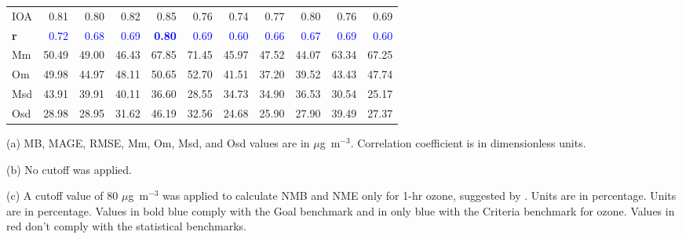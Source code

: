 \begin{table}
\begin{threeparttable}[b]
\begin{tabular}{lrrrrrrrrrr}
IOA  &      0.81 &      0.80 &     0.82 &    0.85 &     0.76 &      0.74 &      0.77 &     0.80 &    0.76 &     0.69 \\
\bf r   &      \textcolor{blue}{0.72} &      \textcolor{blue}{0.68} &     \textcolor{blue}{0.69} &    \textcolor{blue}{\bf 0.80} &     \textcolor{blue}{0.69} &      \textcolor{blue}{0.60} &      \textcolor{blue}{0.66} &     \textcolor{blue}{0.67} &    \textcolor{blue}{0.69} &     \textcolor{blue}{0.60} \\
Mm   &     50.49 &     49.00 &    46.43 &   67.85 &    71.45 &     45.97 &     47.52 &    44.07 &   63.34 &    67.25 \\
Om   &     49.98 &     44.97 &    48.11 &   50.65 &    52.70 &     41.51 &     37.20 &    39.52 &   43.43 &    47.74 \\
Msd  &     43.91 &     39.91 &    40.11 &   36.60 &    28.55 &     34.73 &     34.90 &    36.53 &   30.54 &    25.17 \\
Osd  &     28.98 &     28.95 &    31.62 &   46.19 &    32.56 &     24.68 &     25.90 &    27.90 &   39.49 &    27.37 \\
\bottomrule
\end{tabular}
\begin{tablenotes}
{\scriptsize
	\item[(a)] MB, MAGE, RMSE, Mm, Om, Msd, and Osd values are in $\mu$g~m$^{-3}$. Correlation coefficient is in dimensionless units.
	\item[(b)] No cutoff was applied.
	\item[(c)] A cutoff value of 80 $\mu$g~m$^{-3}$ was applied to calculate NMB and NME only for 1-hr ozone, suggested by \citet{Emery2017}. Units are in percentage. Units are in percentage. Values in bold blue comply with the Goal benchmark and in only blue with the Criteria benchmark for ozone. Values in red don't comply with the statistical benchmarks.}
\end{tablenotes}
\end{threeparttable}
\end{table}

